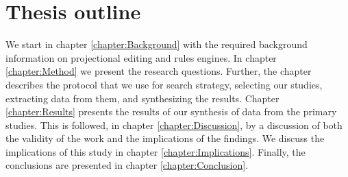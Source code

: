 \section{Thesis outline}

We start in chapter \ref{chapter:Background} with the required background information on projectional editing and rules engines.
In chapter \ref{chapter:Method} we present the research questions.
Further, the chapter describes the protocol that we use for search strategy, selecting our studies, extracting data from them, and synthesizing the results.
Chapter \ref{chapter:Results} presents the results of our synthesis of data from the primary studies.
This is followed, in chapter \ref{chapter:Discussion}, by a discussion of both the validity of the work and the implications of the findings.
We discuss the implications of this study in chapter \ref{chapter:Implications}.
Finally, the conclusions are presented in chapter \ref{chapter:Conclusion}. 
